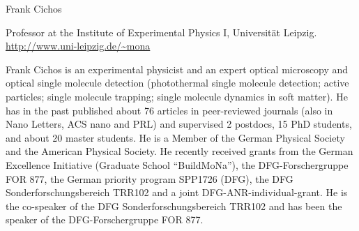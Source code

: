 \begin{participant}[type=PI,PM=12,gender=male,salary=5500]{Frank Cichos}

Professor at the Institute of Experimental Physics I, Universität Leipzig. \url{http://www.uni-leipzig.de/~mona}

Frank Cichos is an experimental physicist and an expert optical microscopy and optical single molecule detection
(photothermal single molecule detection; active particles; single molecule trapping; single molecule dynamics in soft matter).
He has in the past published about 76 articles in peer-reviewed journals (also in Nano Letters, ACS nano and PRL) 
and supervised 2 postdocs, 15 PhD students, and about 20 master students.
He is a Member of the German Physical Society and the American Physical Society. He recently received grants from the German
Excellence Initiative (Graduate School ``BuildMoNa''), the DFG-Forschergruppe FOR 877, the German priority program SPP1726 
(DFG), the DFG Sonderforschungsbereich TRR102 and a joint  DFG-ANR-individual-grant. He is the co-speaker of the 
DFG Sonderforschungsbereich TRR102 and has been the speaker of the DFG-Forschergruppe FOR 877.

\end{participant}
